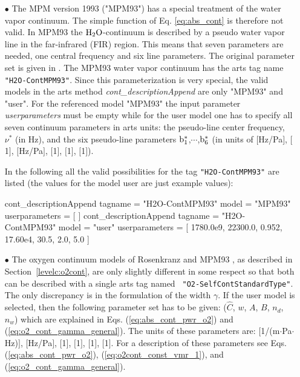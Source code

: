 \begin{itemize}
\item[$\bullet$] The MPM version 1993 ("MPM93") \citep{liebeetal:93} 
has a special treatment of the water vapor continuum. The simple 
function of Eq. \ref{eq:abs_cont} is therefore not valid. In MPM93 
the $\mbox{H}_2\mbox{O}$-continuum is described by a pseudo water vapor line in the 
far-infrared (FIR) region. This means that seven parameters are 
needed, one central frequency and six line parameters. The original 
parameter set is given in \citet{liebeetal:93}. The MPM93 water vapor 
continuum has the arts tag name {\tt "H2O-ContMPM93"}. Since this 
parameterization is very special, the valid models 
in the arts method {\it cont\_descriptionAppend} are only 
"MPM93" and "user". For the referenced model "MPM93" the 
input parameter {\it userparameters} must be empty while 
for the user model one has to specify all seven continuum 
parameters in arts units: the pseudo-line center frequency, 
$\nu^*$ (in Hz), and the six pseudo-line parameters $\rm b^*_{\rm 1}$,$\cdots$,$\rm b^*_{\rm 6}$ 
(in units of $[$Hz/Pa$]$, $[$1$]$, $[$Hz/Pa$]$, $[$1$]$, $[$1$]$, $[$1$]$).

In the following all the valid possibilities for the
tag {\tt "H2O-ContMPM93"} are listed (the values for the 
model user are just example values):
\begin{code}
cont_descriptionAppend{
    tagname        = "H2O-ContMPM93"
    model          = "MPM93"
    userparameters = [ ]
}
cont_descriptionAppend{
    tagname        = "H2O-ContMPM93"
    model          = "user"
    userparameters = [ 1780.0e9, 22300.0, 0.952, 
                       17.60e4, 30.5, 2.0, 5.0 ]
}
\end{code}


\item[$\bullet$] The oxygen continuum models of Rosenkranz
  \citep{pwr:93} and MPM93 \citep{liebeetal:93}, as described in
  Section~\ref{levelc:o2cont}, are only slightly dif\-ferent in some
  respect so that
  both can be described with a single arts tag named {\tt
    "O2-SelfContStandardType"}. The only discrepancy is in the
  formulation of the width $\gamma$. If the user model is selected,
  then the following parameter set has to be given: ($\widehat{C}$,
  $w$, $A$, $B$, $n_d$, $n_w$) which are explained in Eqs.
  (\ref{eq:abs_cont_pwr_o2}) and (\ref{eq:o2_cont_gamma_general}).
  The units of these parameters are: $[$1/(m$\cdot$Pa$\cdot$Hz)$]$,
  $[$Hz/Pa$]$, $[$1$]$, $[$1$]$, $[$1$]$, $[$1$]$. For a description
  of these parameters see Eqs. (\ref{eq:abs_cont_pwr_o2}),
  (\ref{eq:o2cont_const_vmr_1}), and (\ref{eq:o2_cont_gamma_general}).
  

\end{itemize}
